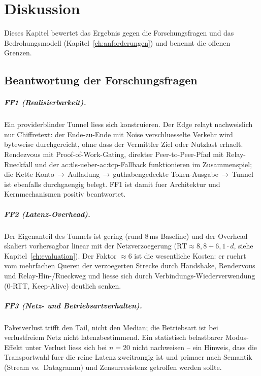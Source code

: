 \chapter{Diskussion}
\label{ch:diskussion}

Dieses Kapitel bewertet das Ergebnis gegen die Forschungsfragen und das
Bedrohungsmodell (Kapitel~\ref{ch:anforderungen}) und benennt die offenen
Grenzen.

\section{Beantwortung der Forschungsfragen}
\label{sec:disk-ff}

\paragraph{FF1 (Realisierbarkeit).} Ein providerblinder Tunnel liess sich
konstruieren. Der Edge relayt nachweislich nur Chiffretext: der Ende-zu-Ende mit
Noise verschluesselte Verkehr wird byteweise durchgereicht, ohne dass der
Vermittler Ziel oder Nutzlast erhaelt. Rendezvous mit Proof-of-Work-Gating,
direkter Peer-to-Peer-Pfad mit Relay-Rueckfall und der
\gls{ac:tls}-ueber-\gls{ac:tcp}-Fallback funktionieren im Zusammenspiel; die
Kette Konto\,$\rightarrow$\,Aufladung\,$\rightarrow$\,guthabengedeckte
Token-Ausgabe\,$\rightarrow$\,Tunnel ist ebenfalls durchgaengig belegt. FF1 ist
damit fuer Architektur und Kernmechanismen positiv beantwortet.

\paragraph{FF2 (Latenz-Overhead).} Der Eigenanteil des Tunnels ist gering (rund
8\,ms Baseline) und der Overhead skaliert vorhersagbar linear mit der
Netzverzoegerung ($\text{RT} \approx 8{,}8 + 6{,}1 \cdot d$, siehe
Kapitel~\ref{ch:evaluation}). Der Faktor $\approx 6$ ist die wesentliche Kosten:
er ruehrt vom mehrfachen Queren der verzoegerten Strecke durch Handshake,
Rendezvous und Relay-Hin-/Rueckweg und liesse sich durch Verbindungs-Wiederverwendung
(0-RTT, Keep-Alive) deutlich senken.

\paragraph{FF3 (Netz- und Betriebsartverhalten).} Paketverlust trifft den Tail,
nicht den Median; die Betriebsart ist bei verlustfreiem Netz nicht
latenzbestimmend. Ein statistisch belastbarer Modus-Effekt unter Verlust liess
sich bei $n=20$ nicht nachweisen -- ein Hinweis, dass die Transportwahl fuer die
reine Latenz zweitrangig ist und primaer nach Semantik (Stream vs.\ Datagramm)
und Zensurresistenz getroffen werden sollte.

